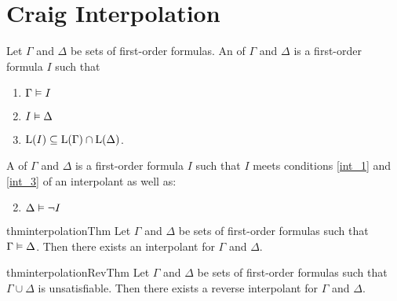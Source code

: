 


\section{Craig Interpolation}


\begin{defi}
	\label{def:interpolant}
	Let $\Gamma$ and $\Delta$ be sets of first-order formulas.
	An  of $\Gamma$ and $\Delta$ is a first-order formula $I$ such that 
	\begin{enumerate}
		\item $ \Gamma \vDash I$ \label{int_1}
		\item $ I \vDash \Delta $  \label{int_2}
		\item $ \operatorname{L}(I) \subseteq \operatorname{L}(\Gamma) \cap \operatorname{L}(\Delta)$.  \label{int_3}
	\end{enumerate}

	\begin{samepage}
		A  of $\Gamma$ and $\Delta$ is a first-order formula $I$ such that $I$ meets conditions \ref{int_1} and \ref{int_3} of an interpolant as well as:
		\begin{enumerate}[\quad\:1'.]
				\setcounter{enumi}{1}
			\item $ \Delta \vDash \lnot I $  \label{int_2prime}
				\qedhere
		\end{enumerate}
	\end{samepage}
\end{defi}

\begin{restatable}[Interpolation]{thm}{interpolationThm}
	\label{thm:interpolation_original}
	Let $\Gamma$ and $\Delta$ be sets of first-order formulas such that $ \Gamma \vDash \Delta $.
	Then there exists an interpolant for $\Gamma$ and $\Delta$.
\end{restatable}
%
\begin{restatable}{thm}{interpolationRevThm}
		\label{thm:interpolation}
		Let $\Gamma$ and $\Delta$ be sets of first-order formulas such that $ \Gamma \cup \Delta $ is unsatisfiable.
		Then there exists a reverse interpolant for $\Gamma$ and\nolinebreak{} $\Delta$.
\end{restatable}



